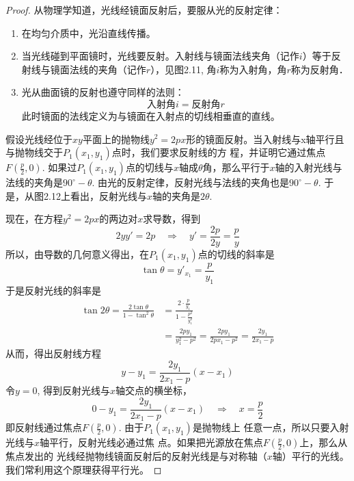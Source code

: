 \begin{proof}
从物理学知道，光线经镜面反射后，要服从光的反射定律：
\begin{enumerate}
    \item 在均匀介质中，光沿直线传播。
    \item 当光线碰到平面镜时，光线要反射。入射线与镜面法线夹角（记作$i$）等于反射线与镜面法线的夹角（记作$r$），见图2.11, 角$i$称为入射角，角$r$称为反射角．
\item 光从曲面镜的反射也遵守同样的法则：
  \[  \text{入射角}i=\text{反射角}r\]
    此时镜面的法线定义为与镜面在入射点的切线相垂直的直线。
\end{enumerate}

\begin{figure}[htp]
    \centering
    \caption{}
\end{figure}

假设光线经位于$xy$平面上的抛物线$y^2=2px$形的镜面反射。当入射线与x轴平行且与抛物线交于$P_1(x_1,y_1)$点时，我们要求反射线的方
程，并证明它通过焦点$F\left(\frac{p}{2},0\right)$. 如果过$P_1(x_1,y_1)$点的切线与$x$轴成$\theta$角，那么平行于$x$轴的入射光线与法线的夹角是$90^{\circ}-\theta$. 由光的反射定律，反射光线与法线的夹角也是$90^{\circ}-\theta$. 于是，从图2.12上看出，反射光线与$x$轴的夹角是$2\theta$.

现在，在方程$y^2=2px$的两边对$x$求导数，得到
\[2yy'=2p\quad \Rightarrow\quad y'=\frac{2p}{2y}=\frac{p}{y}\]
所以，由导数的几何意义得出，在$P_1(x_1,y_1)$点的切线的斜率是
\[\tan\theta=y'_{x_1}=\frac{p}{y_1}\]
于是反射光线的斜率是
\[\begin{split}
    \tan2\theta=\frac{2\tan\theta}{1-\tan^2\theta}&=\frac{2\cdot \frac{p}{y_1}}{1-\frac{p^2}{y^2_1}}\\
    &=\frac{2py_1}{y^2_1-p^2}=\frac{2py_1}{2px_1-p^2}=\frac{2y_1}{2x_1-p}
\end{split}\]
从而，得出反射线方程
\[y-y_1=\frac{2y_1}{2x_1-p}(x-x_1) \]
令$y=0$, 得到反射光线与$x$轴交点的横坐标，
\[0-y_1=\frac{2y_1}{2x_1-p}(x-x_1)\quad \Rightarrow\quad x=\frac{p}{2}\]
即反射线通过焦点$F\left(\frac{p}{2},0\right)$. 由于$P_1(x_1,y_1)$是抛物线上
任意一点，所以只要入射光线与$x$轴平行，反射光线必通过焦
点。如果把光源放在焦点$F\left(\frac{p}{2},0\right)$上，那么从焦点发出的
光线经抛物线镜面反射后的反射光线是与对称轴（$x$轴）平行的光线。我们常利用这个原理获得平行光。
\end{proof}

